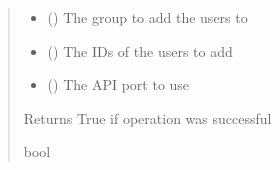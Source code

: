 \documentclass[letterpaper,10pt,english]{sphinxmanual}
\begin{document}
\begin{fulllineitems}
\begin{fulllineitems}
\begin{sphinxVerbatim}[commandchars=\\\{\}]
 
  
 \PYG{p}{[} \PYG{p}{]}
\end{sphinxVerbatim}
\begin{quote}\begin{description}
\begin{itemize}
\item {} 
\sphinxAtStartPar
{} () \textendash{} The group to add the users to

\item {} 
\sphinxAtStartPar
{} () \textendash{} The IDs of the users to add

\item {} 
\sphinxAtStartPar
{} (\sphinxstyleliteralemphasis{\sphinxupquote{ (}}\sphinxstyleliteralemphasis{\sphinxupquote{)}}) \textendash{} The API port to use

\end{itemize}

\sphinxAtStartPar
{} \textendash{} Returns True if operation was successful

\sphinxAtStartPar
bool

\end{description}\end{quote}

\end{fulllineitems}


\end{fulllineitems}
\end{document}
